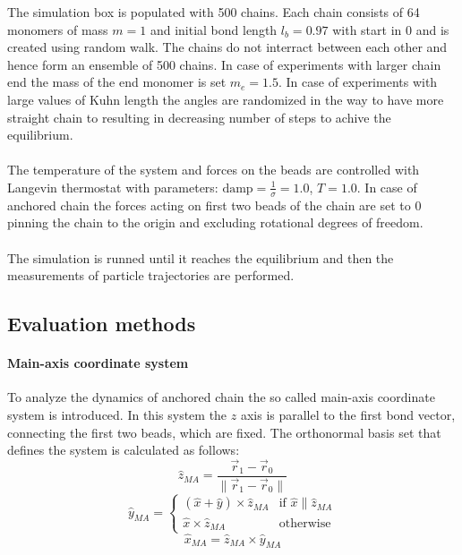 \documentclass[
    paper=A4,pagesize=automedia,fontsize=12pt,
    BCOR=15mm,DIV=22,
    twoside,headinclude,footinclude=false,
    ngerman,fleqn,             %
    bibliography=totocnumbered,          %
    listof=totoc,                %
    listof=flat,                 %
    cleardoublepage=empty      %
    numbers=endperiod
]{scrartcl}
\begin{document}
The simulation box is populated with 500 chains. Each chain consists of 64 monomers of mass $m=1$
and initial bond length $l_b=0.97$ with start in $0$ and is created using random walk. 
The chains do not interract between each other and hence form
an ensemble of 500 chains. In case of experiments with larger chain end the mass of the end monomer
is set $m_e=1.5$. In case of experiments with large values of Kuhn length the angles are randomized in 
the way to have more straight chain to resulting in decreasing number of steps to achive the
equilibrium.
\\
\\
The temperature of the system and forces on the beads are controlled with
Langevin thermostat with parameters: $\text{damp}=\frac{1}{\sigma}=1.0$, $T=1.0$. In case of anchored
chain the forces acting on first two beads of the chain are set to 0 pinning the chain to the origin
and excluding rotational degrees of freedom.
\\
\\
The simulation is runned until it reaches the equilibrium and then the measurements
of particle trajectories are performed. 

\subsection{Evaluation methods}
\paragraph{Main-axis coordinate system}
To analyze the dynamics of anchored chain the so called main-axis coordinate
system is introduced. In this system the $z$ axis is parallel to the
first bond vector, connecting the first two beads, which are fixed.
The orthonormal basis set that defines the system is calculated as follows:
\begin{equation}
    \hat{z}_{MA} = \frac{\vec{r}_1 - \vec{r}_0}{\| \vec{r}_1 - \vec{r}_0 \|}
\end{equation}
\begin{equation}
    \hat{y}_{MA} = 
    \begin{cases}
        (\hat{x} + \hat{y}) \times \hat{z}_{MA} & \text{if } \hat{x} \parallel \hat{z}_{MA} \\
        \hat{x} \times \hat{z}_{MA} & \text{otherwise}
    \end{cases}
\end{equation}
\begin{equation}
    \hat{x}_{MA} = \hat{z}_{MA} \times \hat{y}_{MA} 
\end{equation}
\end{document}
